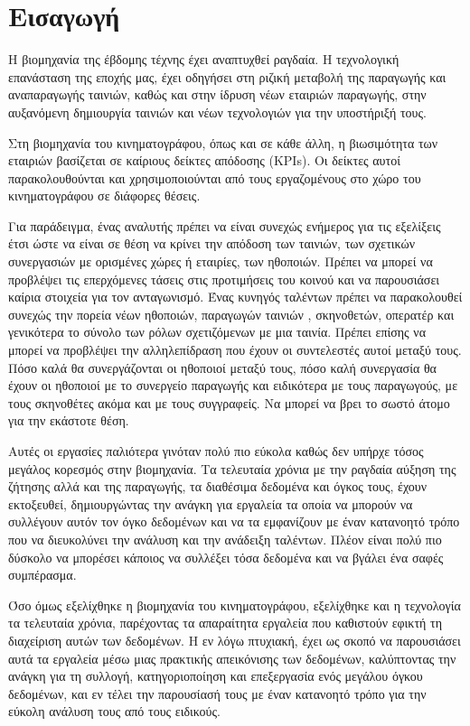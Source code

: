 \chapter{Εισαγωγή}
Η βιομηχανία της έβδομης τέχνης έχει αναπτυχθεί ραγδαία. Η τεχνολογική επανάσταση της εποχής μας, έχει οδηγήσει στη ριζική μεταβολή της παραγωγής και αναπαραγωγής ταινιών, καθώς και στην  ίδρυση νέων εταιριών παραγωγής, στην αυξανόμενη δημιουργία ταινιών και νέων τεχνολογιών για την υποστήριξή τους.

Στη βιομηχανία του κινηματογράφου, όπως και σε κάθε άλλη, η βιωσιμότητα των εταιριών βασίζεται σε καίριους δείκτες απόδοσης (KPIs). Οι δείκτες αυτοί παρακολουθούνται και χρησιμοποιούνται από τους εργαζομένους στο χώρο του κινηματογράφου σε διάφορες θέσεις. 

Για παράδειγμα, ένας αναλυτής πρέπει να είναι συνεχώς ενήμερος για τις εξελίξεις έτσι ώστε να είναι σε θέση να κρίνει την απόδοση των ταινιών, των σχετικών συνεργασιών με ορισμένες χώρες ή εταιρίες, των ηθοποιών. Πρέπει να μπορεί να προβλέψει τις επερχόμενες τάσεις στις προτιμήσεις του κοινού και να παρουσιάσει καίρια στοιχεία για τον ανταγωνισμό. Ένας κυνηγός ταλέντων πρέπει να παρακολουθεί συνεχώς την πορεία νέων ηθοποιών, παραγωγών ταινιών , σκηνοθετών, οπερατέρ και γενικότερα το σύνολο των ρόλων σχετιζόμενων με μια ταινία. Πρέπει επίσης να μπορεί να προβλέψει την αλληλεπίδραση που έχουν οι συντελεστές αυτοί μεταξύ τους. Πόσο καλά θα συνεργάζονται οι ηθοποιοί μεταξύ τους, πόσο καλή συνεργασία θα έχουν οι ηθοποιοί με το συνεργείο παραγωγής και ειδικότερα με τους παραγωγούς, με τους σκηνοθέτες ακόμα και με τους συγγραφείς. Να μπορεί να βρει το σωστό άτομο για την εκάστοτε θέση. 

Αυτές οι εργασίες παλιότερα γινόταν πολύ πιο εύκολα καθώς δεν υπήρχε τόσος μεγάλος κορεσμός στην βιομηχανία. Τα τελευταία χρόνια με την ραγδαία αύξηση της ζήτησης αλλά και της παραγωγής, τα διαθέσιμα δεδομένα και όγκος τους, έχουν εκτοξευθεί, δημιουργώντας την ανάγκη για εργαλεία τα οποία να μπορούν να συλλέγουν αυτόν τον όγκο δεδομένων και να τα εμφανίζουν με έναν κατανοητό τρόπο που να διευκολύνει την ανάλυση και την ανάδειξη ταλέντων. Πλέον είναι πολύ πιο δύσκολο να μπορέσει κάποιος να συλλέξει τόσα δεδομένα και να βγάλει ένα σαφές συμπέρασμα. 

Όσο όμως εξελίχθηκε η βιομηχανία του κινηματογράφου, εξελίχθηκε και η τεχνολογία τα τελευταία χρόνια, παρέχοντας τα απαραίτητα εργαλεία που καθιστούν εφικτή τη διαχείριση αυτών των δεδομένων. Η εν λόγω πτυχιακή, έχει ως σκοπό να παρουσιάσει αυτά τα εργαλεία μέσω μιας πρακτικής απεικόνισης των δεδομένων, καλύπτοντας την ανάγκη για τη συλλογή, κατηγοριοποίηση και επεξεργασία ενός μεγάλου όγκου δεδομένων, και εν τέλει την παρουσίασή τους με έναν κατανοητό τρόπο για την εύκολη ανάλυση τους από τους ειδικούς. 


